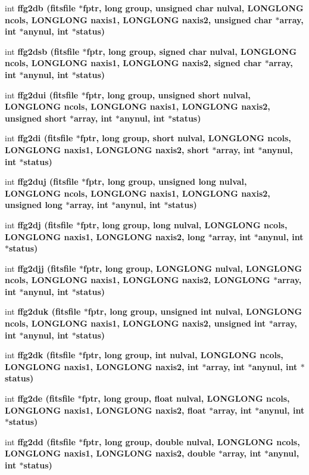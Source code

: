 \begin{CompactItemize}
\item 
int \bf{ffg2db} (\bf{fitsfile} $\ast$fptr, long group, unsigned char nulval, \bf{LONGLONG} ncols, \bf{LONGLONG} naxis1, \bf{LONGLONG} naxis2, unsigned char $\ast$array, int $\ast$anynul, int $\ast$status)
\item 
int \bf{ffg2dsb} (\bf{fitsfile} $\ast$fptr, long group, signed char nulval, \bf{LONGLONG} ncols, \bf{LONGLONG} naxis1, \bf{LONGLONG} naxis2, signed char $\ast$array, int $\ast$anynul, int $\ast$status)
\item 
int \bf{ffg2dui} (\bf{fitsfile} $\ast$fptr, long group, unsigned short nulval, \bf{LONGLONG} ncols, \bf{LONGLONG} naxis1, \bf{LONGLONG} naxis2, unsigned short $\ast$array, int $\ast$anynul, int $\ast$status)
\item 
int \bf{ffg2di} (\bf{fitsfile} $\ast$fptr, long group, short nulval, \bf{LONGLONG} ncols, \bf{LONGLONG} naxis1, \bf{LONGLONG} naxis2, short $\ast$array, int $\ast$anynul, int $\ast$status)
\item 
int \bf{ffg2duj} (\bf{fitsfile} $\ast$fptr, long group, unsigned long nulval, \bf{LONGLONG} ncols, \bf{LONGLONG} naxis1, \bf{LONGLONG} naxis2, unsigned long $\ast$array, int $\ast$anynul, int $\ast$status)
\item 
int \bf{ffg2dj} (\bf{fitsfile} $\ast$fptr, long group, long nulval, \bf{LONGLONG} ncols, \bf{LONGLONG} naxis1, \bf{LONGLONG} naxis2, long $\ast$array, int $\ast$anynul, int $\ast$status)
\item 
int \bf{ffg2djj} (\bf{fitsfile} $\ast$fptr, long group, \bf{LONGLONG} nulval, \bf{LONGLONG} ncols, \bf{LONGLONG} naxis1, \bf{LONGLONG} naxis2, \bf{LONGLONG} $\ast$array, int $\ast$anynul, int $\ast$status)
\item 
int \bf{ffg2duk} (\bf{fitsfile} $\ast$fptr, long group, unsigned int nulval, \bf{LONGLONG} ncols, \bf{LONGLONG} naxis1, \bf{LONGLONG} naxis2, unsigned int $\ast$array, int $\ast$anynul, int $\ast$status)
\item 
int \bf{ffg2dk} (\bf{fitsfile} $\ast$fptr, long group, int nulval, \bf{LONGLONG} ncols, \bf{LONGLONG} naxis1, \bf{LONGLONG} naxis2, int $\ast$array, int $\ast$anynul, int $\ast$status)
\item 
int \bf{ffg2de} (\bf{fitsfile} $\ast$fptr, long group, float nulval, \bf{LONGLONG} ncols, \bf{LONGLONG} naxis1, \bf{LONGLONG} naxis2, float $\ast$array, int $\ast$anynul, int $\ast$status)
\item 
int \bf{ffg2dd} (\bf{fitsfile} $\ast$fptr, long group, double nulval, \bf{LONGLONG} ncols, \bf{LONGLONG} naxis1, \bf{LONGLONG} naxis2, double $\ast$array, int $\ast$anynul, int $\ast$status)

\end{CompactItemize}
